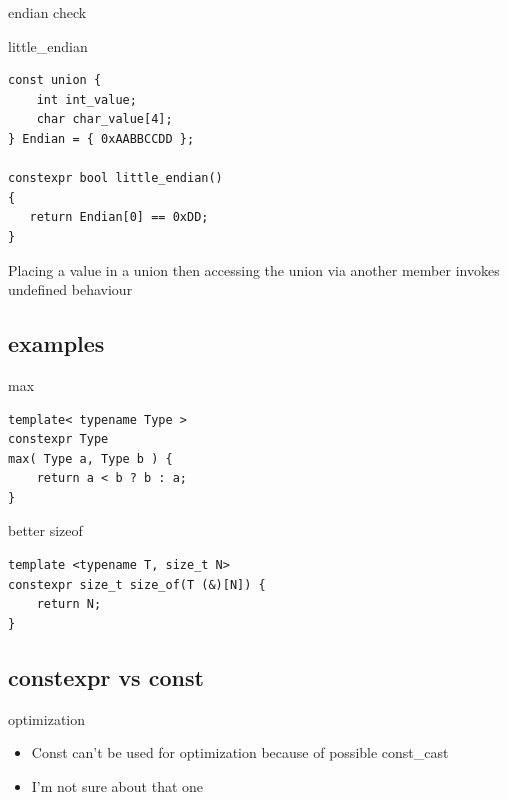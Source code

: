 \documentclass{beamer}
\begin{document}
\begin{frame}[fragile]{endian check}
  \begin{block}{little\_endian}
\begin{verbatim}
const union {
    int int_value;
    char char_value[4];
} Endian = { 0xAABBCCDD };

constexpr bool little_endian()
{
   return Endian[0] == 0xDD;
}

\end{verbatim}
Placing a value in a union then accessing the union via another
member invokes undefined behaviour
  \end{block}
\end{frame}

\subsection{examples}
\begin{frame}[fragile]{max}
\begin{verbatim}
template< typename Type >
constexpr Type
max( Type a, Type b ) {
    return a < b ? b : a;
}

\end{verbatim}
\end{frame}

\begin{frame}[fragile]{better sizeof}
  \begin{block}{}
\begin{verbatim}
template <typename T, size_t N>
constexpr size_t size_of(T (&)[N]) {
    return N;
}

\end{verbatim}
  \end{block}
\end{frame}

\subsection{constexpr vs const}
\begin{frame}{optimization}
  \begin{block}{}
    \begin{itemize}
    \item Const can't be used for optimization because of possible const\_cast
    \item I'm not sure about that one
    \end{itemize}
  \end{block}
\end{frame}
\end{document}

